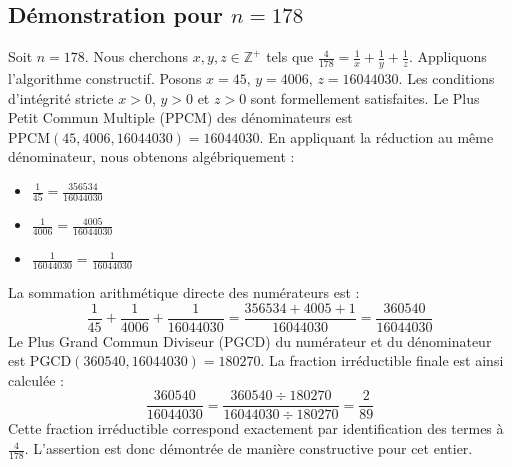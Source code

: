 \documentclass[11pt,a4paper]{article}
\begin{document}
\subsection{Démonstration pour $n = 178$}
Soit $n = 178$. Nous cherchons $x, y, z \in \mathbb{Z}^{+}$ tels que $\frac{4}{178} = \frac{1}{x} + \frac{1}{y} + \frac{1}{z}$.
Appliquons l'algorithme constructif. Posons $x = 45$, $y = 4006$, $z = 16044030$.
Les conditions d'intégrité stricte $x > 0$, $y > 0$ et $z > 0$ sont formellement satisfaites.
Le Plus Petit Commun Multiple (PPCM) des dénominateurs est $\text{PPCM}(45, 4006, 16044030) = 16044030$.
En appliquant la réduction au même dénominateur, nous obtenons algébriquement :
\begin{itemize}
    \item $\frac{1}{45} = \frac{356534}{16044030}$
    \item $\frac{1}{4006} = \frac{4005}{16044030}$
    \item $\frac{1}{16044030} = \frac{1}{16044030}$
\end{itemize}
La sommation arithmétique directe des numérateurs est :
$$ \frac{1}{45} + \frac{1}{4006} + \frac{1}{16044030} = \frac{356534 + 4005 + 1}{16044030} = \frac{360540}{16044030} $$
Le Plus Grand Commun Diviseur (PGCD) du numérateur et du dénominateur est $\text{PGCD}(360540, 16044030) = 180270$.
La fraction irréductible finale est ainsi calculée :
$$ \frac{360540}{16044030} = \frac{360540 \div 180270}{16044030 \div 180270} = \frac{2}{89} $$
Cette fraction irréductible correspond exactement par identification des termes à $\frac{4}{178}$. L'assertion est donc démontrée de manière constructive pour cet entier.
\end{document}
